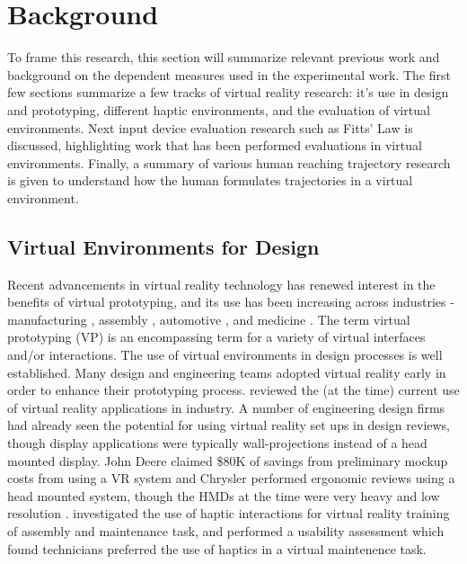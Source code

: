 \section{Background}

To frame this research, this section will summarize relevant previous work and background on the dependent measures used in the experimental work.
The first few sections summarize a few tracks of virtual reality research: it's use in design and prototyping, different haptic environments, and the evaluation of virtual environments.
Next input device evaluation research such as Fitts' Law is discussed, highlighting work that has been performed evaluations in virtual environments.
Finally, a summary of various human reaching trajectory research is given to understand how the human formulates trajectories in a virtual environment.

\subsection{Virtual Environments for Design}

Recent advancements in virtual reality technology has renewed interest in the benefits of virtual prototyping, and its use has been increasing across industries - manufacturing \citep{choi_virtual_2015}, assembly \citep{pontonnier_designing_2014}, automotive \citep{bordegoni_mixed_2012,lawson_future_2016}, and medicine \citep{nagendran_virtual_2013}.
The term virtual prototyping (VP) is an encompassing term for a variety of virtual interfaces and/or interactions.
The use of virtual environments in design processes is well established.
Many design and engineering teams adopted virtual reality early in order to enhance their prototyping process.
\citet{brooks_jr_whats_1999} reviewed the (at the time) current use of virtual reality applications in industry.
A number of engineering design firms had already seen the potential for using virtual reality set ups in design reviews, though display applications were typically wall-projections instead of a head mounted display.
John Deere claimed \$80K of savings from preliminary mockup costs from using a VR system and Chrysler performed ergonomic reviews using a head mounted system, though the HMDs at the time were very heavy and low resolution \citep{brooks_jr_whats_1999}.
\citet{abate_haptic-based_2009} investigated the use of haptic interactions for virtual reality training of assembly and maintenance task, and performed a usability assessment which found technicians preferred the use of haptics in a virtual maintenence task.


